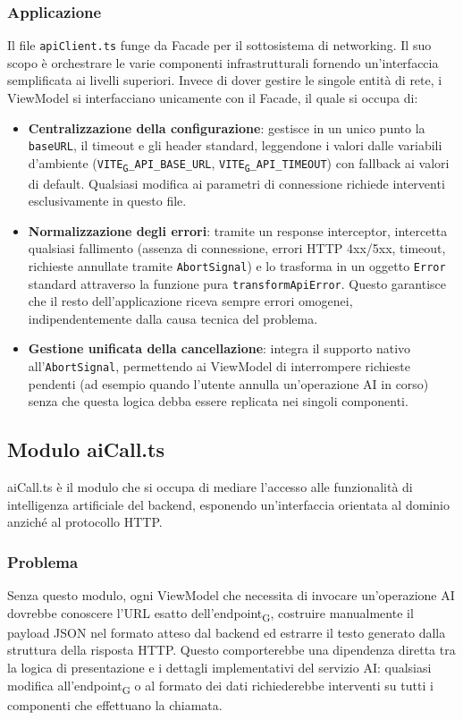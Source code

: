 \documentclass[11pt,a4paper]{article}
\newcommand{\gls}[1]{#1\textsubscript{G}}
\begin{document}
\subsubsection{Applicazione}
Il file \texttt{apiClient.ts} funge da Facade per il sottosistema di networking. Il suo scopo è orchestrare le varie componenti infrastrutturali fornendo un'interfaccia semplificata ai livelli superiori. Invece di dover gestire le singole entità di rete, i ViewModel si interfacciano unicamente con il Facade, il quale si occupa di:
\begin{itemize}
\item \textbf{Centralizzazione della configurazione}: gestisce in un unico punto la \texttt{baseURL}, il timeout e gli header standard, leggendone i valori dalle variabili d'ambiente (\texttt{\gls{VITE}\_API\_BASE\_URL}, \texttt{\gls{VITE}\_API\_TIMEOUT}) con fallback ai valori di default. Qualsiasi modifica ai parametri di connessione richiede interventi esclusivamente in questo file.
\item \textbf{Normalizzazione degli errori}: tramite un response interceptor, intercetta qualsiasi fallimento (assenza di connessione, errori HTTP 4xx/5xx, timeout, richieste annullate tramite \texttt{AbortSignal}) e lo trasforma in un oggetto \texttt{Error} standard attraverso la funzione pura \texttt{transformApiError}. Questo garantisce che il resto dell'applicazione riceva sempre errori omogenei, indipendentemente dalla causa tecnica del problema.
\item \textbf{Gestione unificata della cancellazione}: integra il supporto nativo all'\texttt{AbortSignal}, permettendo ai ViewModel di interrompere richieste pendenti (ad esempio quando l'utente annulla un'operazione AI in corso) senza che questa logica debba essere replicata nei singoli componenti.
\end{itemize}

\subsection{Modulo aiCall.ts}
aiCall.ts è il modulo che si occupa di mediare l'accesso alle funzionalità di intelligenza artificiale del backend, esponendo un'interfaccia orientata al dominio anziché al protocollo HTTP.

\subsubsection{Problema}
Senza questo modulo, ogni ViewModel che necessita di invocare un'operazione AI dovrebbe conoscere l'URL esatto dell'\gls{endpoint}, costruire manualmente il payload JSON nel formato atteso dal backend ed estrarre il testo generato dalla struttura della risposta HTTP. Questo comporterebbe una dipendenza diretta tra la logica di presentazione e i dettagli implementativi del servizio AI: qualsiasi modifica all'\gls{endpoint} o al formato dei dati richiederebbe interventi su tutti i componenti che effettuano la chiamata.
\end{document}
